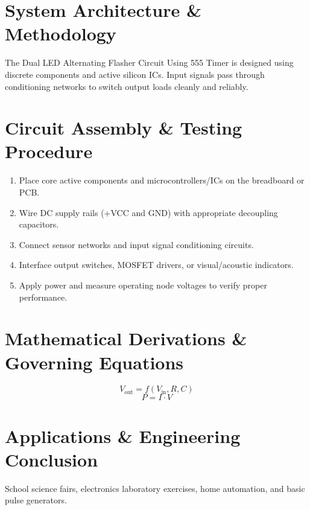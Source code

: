 \documentclass[11pt,a4paper]{article}
\begin{document}
\section{System Architecture \& Methodology}
The Dual LED Alternating Flasher Circuit Using 555 Timer is designed using discrete components and active silicon ICs. Input signals pass through conditioning networks to switch output loads cleanly and reliably.

\section{Circuit Assembly \& Testing Procedure}
\begin{enumerate}
    \item Place core active components and microcontrollers/ICs on the breadboard or PCB.
    \item Wire DC supply rails (+VCC and GND) with appropriate decoupling capacitors.
    \item Connect sensor networks and input signal conditioning circuits.
    \item Interface output switches, MOSFET drivers, or visual/acoustic indicators.
    \item Apply power and measure operating node voltages to verify proper performance.
\end{enumerate}

\section{Mathematical Derivations \& Governing Equations}
\begin{equation}
V_{\text{out}} = f(V_{\text{in}}, R, C)
\end{equation}
\begin{equation}
P = I \cdot V
\end{equation}

\section{Applications \& Engineering Conclusion}
School science fairs, electronics laboratory exercises, home automation, and basic pulse generators.
\end{document}

